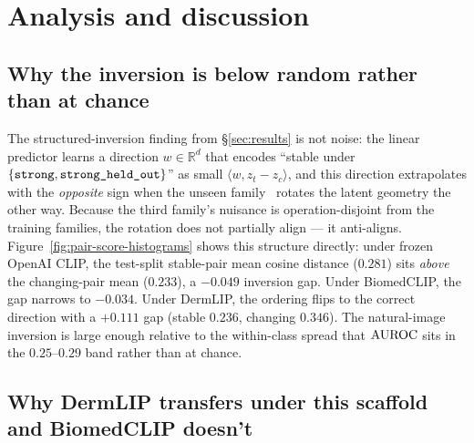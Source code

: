 \section{Analysis and discussion}
\label{sec:analysis}

\subsection{Why the inversion is below random rather than at chance}
\label{sec:analysis:inversion}

The structured-inversion finding from \S\ref{sec:results} is not noise:
the linear predictor learns a direction $w \in \mathbb{R}^{d}$ that
encodes ``stable under $\{\texttt{strong}, \texttt{strong\_held\_out}\}$'' as small
$\langle w, z_{t} - z_{c} \rangle$,
and this direction extrapolates with the \emph{opposite} sign when the unseen
family \strongholdtwo\ rotates the latent geometry the other way. Because the
third family's nuisance is operation-disjoint from the training families, the
rotation does not partially align --- it anti-aligns. Figure~\ref{fig:pair-score-histograms}
shows this structure directly: under frozen OpenAI CLIP, the test-split
stable-pair mean cosine distance ($0.281$) sits \emph{above} the
changing-pair mean ($0.233$), a $-0.049$ inversion gap. Under
BiomedCLIP, the gap narrows to $-0.034$. Under DermLIP, the ordering
flips to the correct direction with a $+0.111$ gap (stable
$0.236$, changing $0.346$). The natural-image inversion is large enough
relative to the within-class spread that $\mathrm{AUROC}$ sits in the
$0.25$--$0.29$ band rather than at chance.

\subsection{Why DermLIP transfers under this scaffold and BiomedCLIP doesn't}
\label{sec:analysis:dermlip-vs-biomedclip}

